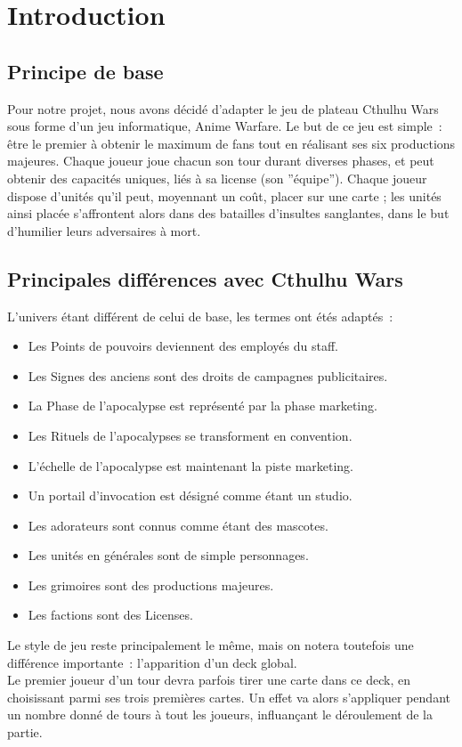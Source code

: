 \chapter{Introduction}

    \section{Principe de base}

        Pour notre projet, nous avons décidé d'adapter le jeu de plateau Cthulhu Wars
        sous forme d'un jeu informatique, Anime Warfare. Le but de ce jeu est simple :
        être le premier à obtenir le maximum de fans tout en réalisant ses six productions
        majeures. Chaque joueur joue chacun son tour durant diverses phases, et peut obtenir
        des capacités uniques, liés à sa license (son ''équipe'').
        \newline
        Chaque joueur dispose d'unités qu'il peut, moyennant un coût, placer sur une
        carte ; les unités ainsi placée s'affrontent alors dans des batailles d'insultes
        sanglantes, dans le but d'humilier leurs adversaires à mort.

    \section{Principales différences avec Cthulhu Wars}

        L'univers étant différent de celui de base, les termes ont étés adaptés :
        \begin{itemize}
            \item Les Points de pouvoirs deviennent des employés du staff.
            \item Les Signes des anciens sont des droits de campagnes publicitaires.
            \item La Phase de l'apocalypse est représenté par la phase marketing.
            \item Les Rituels de l'apocalypses se transforment en convention.
            \item L'échelle de l'apocalypse est maintenant la piste marketing.
            \item Un portail d'invocation est désigné comme étant un studio.
            \item Les adorateurs sont connus comme étant des mascotes.
            \item Les unités en générales sont de simple personnages.
            \item Les grimoires sont des productions majeures.
            \item Les factions sont des Licenses.
        \end{itemize}

        Le style de jeu reste principalement le même, mais on notera toutefois une
        différence importante : l'apparition d'un deck global. \\
        Le premier joueur d'un tour devra parfois tirer une carte dans ce deck, en
        choisissant parmi ses trois premières cartes. Un effet va alors s'appliquer
        pendant un nombre donné de tours à tout les joueurs, influançant le déroulement
        de la partie.